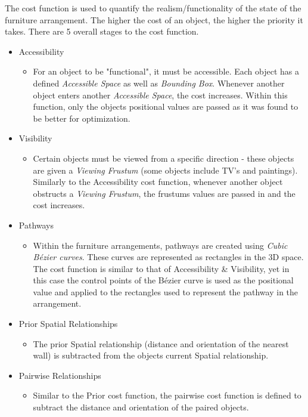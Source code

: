 The cost function is used to quantify the realism/functionality of the state of the furniture arrangement.
The higher the cost of an object, the higher the priority it takes. There are 5 overall stages to the cost function.
\begin{itemize}
    \item Accessibility
        \begin{itemize}
            \item For an object to be "functional", it must be accessible. Each object has a defined \textit{Accessible Space} as well as \textit{Bounding Box}. Whenever another object enters another \textit{Accessible Space}, the cost increases. Within this function, only the objects positional values are passed as it was found to be better for optimization.
        \end{itemize}
    \item Visibility
        \begin{itemize}
            \item Certain objects must be viewed from a specific direction - these objects are given a \textit{Viewing Frustum} (some objects include TV's and paintings). Similarly to the Accessibility cost function, whenever another object obstructs a \textit{Viewing Frustum}, the frustums values are passed in and the cost increases.
        \end{itemize}
    \item Pathways
        \begin{itemize}
            \item Within the furniture arrangements, pathways are created using \textit{Cubic Bézier curves}. These curves are represented as rectangles in the 3D space. The cost function is similar to that of Accessibility \& Visibility, yet in this case the control points of the Bézier curve is used as the positional value and applied to the rectangles used to represent the pathway in the arrangement.
        \end{itemize}
    \item Prior Spatial Relationships
        \begin{itemize}
            \item The prior Spatial relationship (distance and orientation of the nearest wall) is subtracted from the objects current Spatial relationship.
        \end{itemize}
    \item Pairwise Relationships
        \begin{itemize}
            \item Similar to the Prior cost function, the pairwise cost function is defined to subtract the distance and orientation of the paired objects.
        \end{itemize}
\end{itemize}



